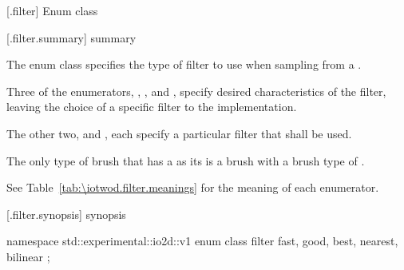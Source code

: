  [\iotwod.filter] {Enum class }

 [\iotwod.filter.summary] { summary}

\pnum
The  enum class specifies the type of filter to use when sampling from a \pixmap.

\pnum
Three of the  enumerators, , , and , specify desired characteristics of the filter, leaving the choice of a specific filter to the implementation. 

The other two,  and , each specify a particular filter that shall be used.

\pnum
\begin{note}
The only type of brush that has a \pixmap as its \underlyingsurface is a brush with a brush type of .
\end{note}

\pnum
See Table~\ref{tab:\iotwod.filter.meanings} for the meaning of each
 enumerator.

 [\iotwod.filter.synopsis] { synopsis}

\begin{codeblock}
namespace std::experimental::io2d::v1 {
  enum class filter {
    fast,
    good,
    best,
    nearest,
    bilinear
  };
}
\end{codeblock}

